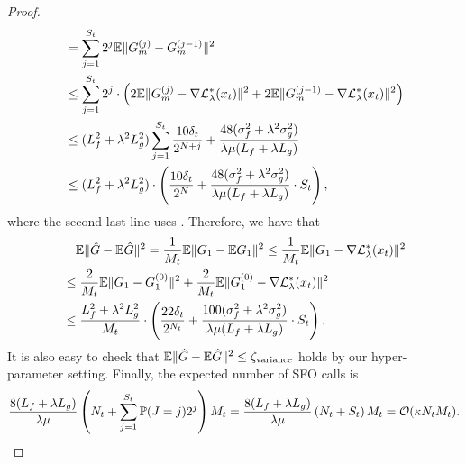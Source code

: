 {\begin{proof}
\begin{align*}
    &= \sum_{j=1}^{S_t} 2^j {\mathbb{E}} \Vert G_m^{(j)} - G_m^{(j-1)} \Vert^2 \\
    & \le \sum_{j=1}^{S_t} 2^j \cdot \left( 2 {\mathbb{E}} \Vert G_m^{(j)} - \nabla {\mathcal{L}}_{\lambda}^*(x_t) \Vert^2 + 2 {\mathbb{E}} \Vert G_m^{(j-1)} - \nabla {\mathcal{L}}_{\lambda}^*(x_t) \Vert^2 \right) \\
    &\le (L_f^2 + \lambda^2 L_g^2) \sum_{j=1}^{S_t} \frac{10 \delta_t}{2^{N+j}} + \frac{48 (\sigma_f^2 + \lambda^2 \sigma_g^2)}{ \lambda \mu (L_f + \lambda L_g)} \\
    &\le (L_f^2 + \lambda^2 L_g^2)  \cdot \left(\frac{10 \delta_t}{2^N} +  \frac{48 (\sigma_f^2 + \lambda^2 \sigma_g^2)}{ \lambda \mu (L_f + \lambda L_g)} \cdot S_t \right),
\end{align*}
where the second last line uses .
Therefore, we have that
\begin{align*}
    &\quad {\mathbb{E}} \Vert \hat G - {\mathbb{E}} \hat G \Vert^2 = \frac{1}{M_t} {\mathbb{E}} \Vert G_1 - {\mathbb{E}} G_1 \Vert^2 \le \frac{1}{M_t} {\mathbb{E}} \Vert G_1 - \nabla {\mathcal{L}}_{\lambda}^*(x_t) \Vert^2 \\
    &\le \frac{2}{M_t} {\mathbb{E}} \Vert G_1 - G_1^{(0)} \Vert^2 + \frac{2}{M_t} {\mathbb{E}} \Vert G_1^{(0)} - \nabla {\mathcal{L}}_{\lambda}^*(x_t) \Vert^2  \\
    &\le \frac{L_f^2 + \lambda^2 L_g^2}{M_t}  \cdot \left(\frac{22 \delta_t}{2^{N_t}} +  \frac{100 (\sigma_f^2 + \lambda^2 \sigma_g^2)}{ \lambda \mu (L_f + \lambda L_g)} \cdot S_t \right).
\end{align*}
It is also easy to check that ${\mathbb{E}} \Vert \hat G - {\mathbb{E}} \hat G \Vert^2 \le \zeta_{\rm variance}$ holds by our hyper-parameter setting.
Finally, the expected number of SFO calls is 
\begin{align*}
    \frac{8(L_f + \lambda L_g)}{\lambda \mu} \left( N_t + \sum_{j=1}^{S_t} {\mathbb{P}}(J=j)  2^j  \right) M_t  = \frac{8(L_f + \lambda L_g)}{\lambda \mu} \left( N_t + S_t \right) M_t = {\mathcal{O}}(\kappa N_t M_t).
\end{align*}
\end{proof}

\thmFSBAsingle* 

}
